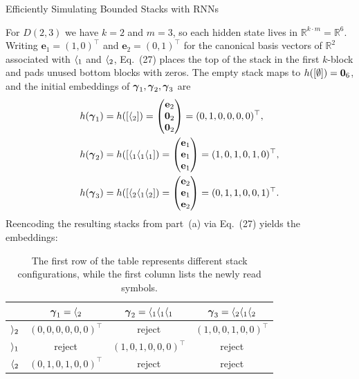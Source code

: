 \begin{question}{Efficiently Simulating Bounded Stacks with RNNs}
\begin{subquestion}
    For $D(2, 3)$ we have $k = 2$ and $m = 3$, so each hidden state lives in $\mathbb{R}^{k \cdot m} = \mathbb{R}^{6}$.
    Writing $\mathbf{e}_1 = (1, 0)^\top$ and $\mathbf{e}_2 = (0, 1)^\top$ for the canonical basis vectors of $\mathbb{R}^{2}$ associated with $\openBr{1}$ and $\openBr{2}$, Eq.~(27) places the top of the stack in the first $k$-block and pads unused bottom blocks with zeros.
    The empty stack maps to $h([\emptystack]) = \mathbf{0}_{6}$, and the initial embeddings of $\stackseq_1, \stackseq_2, \stackseq_3$ are
    \begin{align*}
        h(\stackseq_1) &= h([\openBr{2}]) = \begin{pmatrix} \mathbf{e}_2 \\ \mathbf{0}_2 \\ \mathbf{0}_2 \end{pmatrix} = (0, 1, 0, 0, 0, 0)^\top, \\
        h(\stackseq_2) &= h([\openBr{1}\openBr{1}\openBr{1}]) = \begin{pmatrix} \mathbf{e}_1 \\ \mathbf{e}_1 \\ \mathbf{e}_1 \end{pmatrix} = (1, 0, 1, 0, 1, 0)^\top, \\
        h(\stackseq_3) &= h([\openBr{2}\openBr{1}\openBr{2}]) = \begin{pmatrix} \mathbf{e}_2 \\ \mathbf{e}_1 \\ \mathbf{e}_2 \end{pmatrix} = (0, 1, 1, 0, 0, 1)^\top.
    \end{align*}
    Reencoding the resulting stacks from part~(a) via Eq.~(27) yields the embeddings:
    \begin{table}[H]
    \centering
    \small
        \begin{tabular}{cccc}
            \toprule
            & $\stackseq_1 = \openBr{2}$ &
            $\stackseq_2 = \openBr{1} \openBr{1} \openBr{1}$ &
            $\stackseq_3 = \openBr{2} \openBr{1} \openBr{2}$ \\
            \midrule
            $\closeBr{2}$ & $(0, 0, 0, 0, 0, 0)^\top$ & reject & $(1, 0, 0, 1, 0, 0)^\top$ \\
            $\closeBr{1}$ & reject & $(1, 0, 1, 0, 0, 0)^\top$ & reject \\
            $\openBr{2}$ & $(0, 1, 0, 1, 0, 0)^\top$ & reject & reject \\
            \bottomrule
        \end{tabular}
        \caption{The first row of the table represents different stack configurations, while the first column lists the newly read symbols.}
        \label{tab:stackembeddings}
    \end{table}
\end{subquestion}


\end{question}
